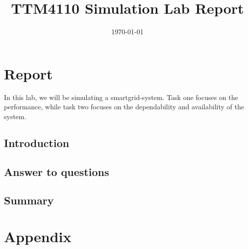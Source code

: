 \documentclass[11pt]{article}
\title{TTM4110 Simulation Lab Report}
\date{{\today}}
\begin{document}
\pagestyle{plain}

\maketitle

\section{Report}

In this lab, we will be simulating a smartgrid-system. Task one focuses on the performance, while task two focuses on the dependability and availability of the system.

\subsection{Introduction}





\subsection{Answer to questions}




\subsection{Summary}


\section*{Appendix}
\end{document}
